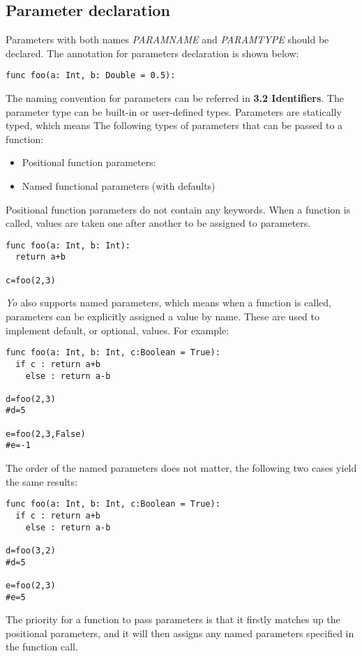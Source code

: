\documentclass[12pt]{article}
\begin{document}
\subsection{Parameter declaration}
Parameters with both names \textit{PARAMNAME} and \textit{PARAMTYPE} should be declared. The annotation for parameters declaration is shown below:
\begin{lstlisting}[caption=Parameter declaration]
func foo(a: Int, b: Double = 0.5):
\end{lstlisting}
The naming convention for parameters can be referred in \textbf{3.2 Identifiers}. The parameter type can be built-in or user-defined types.
Parameters are statically typed, which means 
The following types of parameters that can be passed to a function:
\begin{itemize}
  \item Positional function parameters: 
    \item Named functional parameters (with defaults)
\end{itemize}
Positional function parameters do not contain any keywords. When a function is called, values are taken one after another to be assigned to parameters.
\begin{lstlisting}[caption=Positional function parameters]
func foo(a: Int, b: Int):
  return a+b

c=foo(2,3)
\end{lstlisting}
\textit{Yo} also supports named parameters, which means when a function is called, parameters can be explicitly assigned a value by name. These are used to implement default, or optional, values. For example:
\begin{lstlisting}[caption=Named parameters]
func foo(a: Int, b: Int, c:Boolean = True):
  if c : return a+b
    else : return a-b

d=foo(2,3)
#d=5

e=foo(2,3,False)
#e=-1
\end{lstlisting}
The order of the named parameters does not matter, the following two cases yield the same results:
\begin{lstlisting}[caption=Non-ordered named parameters]
func foo(a: Int, b: Int, c:Boolean = True):
  if c : return a+b
    else : return a-b

d=foo(3,2)
#d=5

e=foo(2,3)
#e=5
\end{lstlisting}
The priority for a function to pass parameters is that it firstly matches up the positional parameters, and it will then assigns any named parameters specified in the function call.
\end{document}
